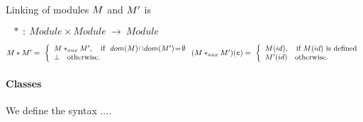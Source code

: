 \begin{definition}
\label{formal:Linking}
Linking  of  modules $M$ and $M{'}$ is 

\noindent $\ \ \ * \ : \ Module \times Module \ \longrightarrow \ Module  $
\noindent

$
\M * \M{'}  =\ \left\{
\begin{array}{l}
                        \M *_{aux} \M{'},\ \ \   \hbox{if}\  \ dom(\M)\!\cap\!dom(\M{'})\!=\!\emptyset\\
\bot  \ \ \ \mbox{otherwise.}
\end{array}
                    \right.\\
(\M *_{aux} \M{'})(\clss{}) =\ \left\{
\begin{array}{l}
 \M(id),\ \ \ \mbox{if }
\M(id) \mbox{ is defined}\\
\M{'}(id) \ \ \  \mbox{otherwise.}
\end{array}
                    \right.
                    $
\end{definition}


 


\paragraph{Classes}
 
 We define the syntax ....

